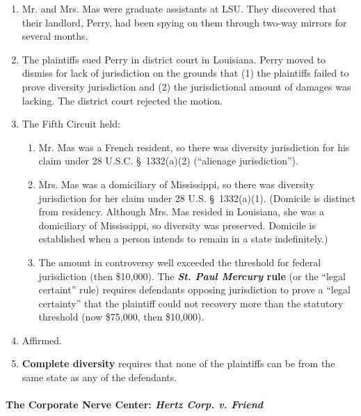 \begin{enumerate}
    \item Mr. and Mrs. Mas were graduate assistants at LSU. They discovered that their landlord, Perry, had been spying on them through two-way mirrors for several months.
    \item The plaintiffs sued Perry in district court in Louisiana. Perry moved to dismiss for lack of jurisdiction on the grounds that (1) the plaintiffs failed to prove diversity jurisdiction and (2) the jurisdictional amount of damages was lacking. The district court rejected the motion.
    \item The Fifth Circuit held:
    \begin{enumerate}
        \item Mr. Mas was a French resident, so there was diversity jurisdiction for his claim under 28 U.S.C. \S\ 1332(a)(2) (``alienage jurisdiction'').
        \item Mrs. Mas was a domiciliary of Mississippi, so there was diversity jurisdiction for her claim under 28 U.S. \S\ 1332(a)(1). (Domicile is distinct from residency. Although Mrs. Mas resided in Louisiana, she was a domiciliary of Mississippi, so diversity was preserved. Domicile is established when a person intends to remain in a state indefinitely.)
        \item The amount in controversy well exceeded the threshold for federal jurisdiction (then \$10,000). The \textbf{\emph{St. Paul Mercury} rule} (or the ``legal certaint'' rule) requires defendants opposing jurisdiction to prove a ``legal certainty'' that the plaintiff could not recovery more than the statutory threshold (now \$75,000, then \$10,000).
    \end{enumerate}
    \item Affirmed.
    \item \textbf{Complete diversity} requires that none of the plaintiffs can be from the same state as any of the defendants.
\end{enumerate}

\paragraph{The Corporate Nerve Center: \emph{Hertz Corp. v. Friend}}

